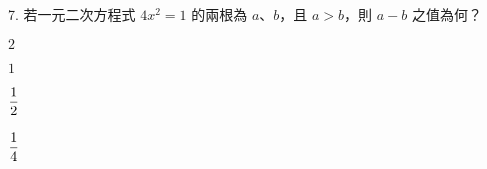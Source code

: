 \documentclass[12pt]{article}
\begin{document}
\begin{problem}
  \item[7.] 若一元二次方程式 $4x^2 = 1$ 的兩根為 $a$、$b$，且 $a > b$，則 $a - b$ 之值為何？
  \begin{choices}
    \item $2$
    \item $1$
    \item $\fraction{1}{2}$
    \item $\fraction{1}{4}$
  \end{choices}
\end{problem}
\end{document}
